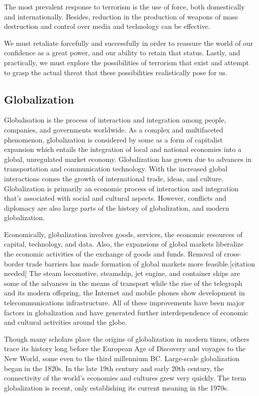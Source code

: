 \documentclass[
  openany]{book}
\begin{document}
The most prevalent response to terrorism is the use of force, both domestically and internationally. Besides, reduction in the production of weapons of mass destruction and control over media and technology can be effective.

We must retaliate forcefully and successfully in order to reassure the world of our confidence as a great power, and our ability to retain that status. Lastly, and practically, we must explore the possibilities of terrorism that exist and attempt to grasp the actual threat that these possibilities realistically pose for us.

\hypertarget{globalization}{%
\subsection{Globalization}\label{globalization}}

Globalisation is the process of interaction and integration among people, companies, and governments worldwide. As a complex and multifaceted phenomenon, globalization is considered by some as a form of capitalist expansion which entails the integration of local and national economies into a global, unregulated market economy. Globalization has grown due to advances in transportation and communication technology. With the increased global interactions comes the growth of international trade, ideas, and culture. Globalization is primarily an economic process of interaction and integration that's associated with social and cultural aspects. However, conflicts and diplomacy are also large parts of the history of globalization, and modern globalization.

Economically, globalization involves goods, services, the economic resources of capital, technology, and data. Also, the expansions of global markets liberalize the economic activities of the exchange of goods and funds. Removal of cross-border trade barriers has made formation of global markets more feasible.{[}citation needed{]} The steam locomotive, steamship, jet engine, and container ships are some of the advances in the means of transport while the rise of the telegraph and its modern offspring, the Internet and mobile phones show development in telecommunications infrastructure. All of these improvements have been major factors in globalization and have generated further interdependence of economic and cultural activities around the globe.

Though many scholars place the origins of globalization in modern times, others trace its history long before the European Age of Discovery and voyages to the New World, some even to the third millennium BC. Large-scale globalization began in the 1820s. In the late 19th century and early 20th century, the connectivity of the world's economies and cultures grew very quickly. The term globalization is recent, only establishing its current meaning in the 1970s.
\end{document}
